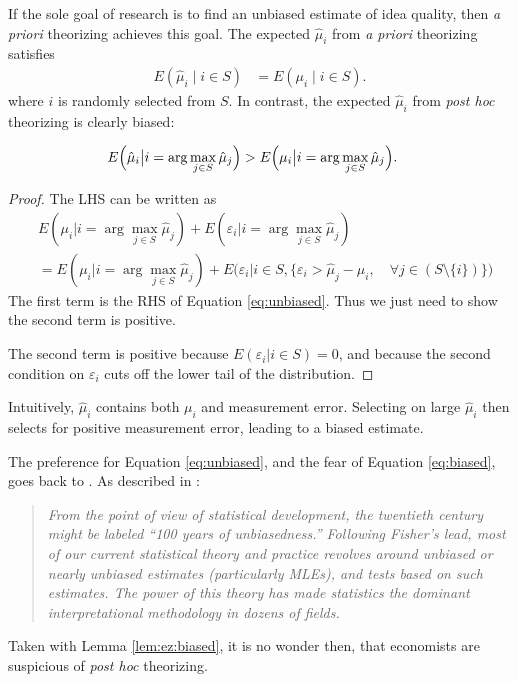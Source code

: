 \documentclass[12pt,english]{article}
\theoremstyle{plain}
\theoremstyle{plain}
\begin{document}
If the sole goal of research is to find an unbiased estimate of idea quality, then \emph{a priori} theorizing achieves this goal.  The expected $\hat{\mu}_{i}$ from \emph{a priori} theorizing satisfies
\begin{align}
E\left(\hat{\mu}_{i}\mid i\in S \right) &= E\left(\mu_{i}\mid i\in S \right).
\label{eq:unbiased}
\end{align}
where $i$ is randomly selected from $S$. In contrast, the expected $\hat{\mu}_{i}$ from \emph{post hoc} theorizing is clearly biased:
\begin{lemma}\label{lem:ez:biased}
    \begin{align}
        E\Bigl(\hat{\mu}_{i}\big|i=\arg\max_{j\in S }\hat{\mu}_{j}\Bigr) & >E\Bigl(\mu_{i}\big|i=\arg\max_{j\in S }\hat{\mu}_{j}\Bigr).
        \label{eq:biased}
    \end{align}            
\end{lemma}
\begin{proof}
    The LHS can be written as 
    \begin{align*}
        &E\left(\mu_i \big| i = \arg\max_{j \in S} \hat{\mu}_j\right) 
        +
        E\left(\varepsilon_i \big| i = \arg\max_{j \in S} \hat{\mu}_j\right) \\        
        &= E\left(\mu_i \big| i = \arg\max_{j \in S} \hat{\mu}_j\right) 
        +
        E\bigg(\varepsilon_i
        \big|
        i \in S,
        \{
         \varepsilon_i 
        > \hat{\mu}_j - \mu_i
        , \quad
         \forall j \in \left( S\setminus\{i\}
         \right)
         \}
         \bigg)
    \end{align*}
The first term is the RHS of Equation \eqref{eq:unbiased}. Thus we just need to show the second term is positive.

The second term is positive because $E\left(\varepsilon_i\big| i \in S\right) = 0$, and because the second condition on $\varepsilon_i$  cuts off the lower tail of the distribution.
\end{proof}


Intuitively, $\hat{\mu}_{i}$ contains both $\mu_{i}$ and measurement error. Selecting on large $\hat{\mu}_{i}$ then selects for positive measurement error, leading to a biased estimate.

The preference for Equation \eqref{eq:unbiased}, and the fear of Equation \eqref{eq:biased}, goes back to \citet{fisher1925statistical}. As described in \citet{efron2001statistical}:
\begin{quote}
    \emph{From the point of view of statistical development, the twentieth century might be labeled ``100 years of unbiasedness.'' Following Fisher's lead, most of our current statistical theory and practice revolves around unbiased or nearly unbiased estimates (particularly MLEs), and tests based on such estimates. The power of this theory has made statistics the dominant interpretational methodology in dozens of fields.}
\end{quote}
Taken with Lemma \ref{lem:ez:biased}, it is no wonder then, that economists are suspicious of \emph{post hoc} theorizing.
\end{document}
